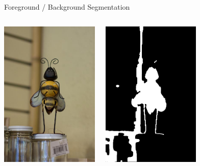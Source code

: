 \documentclass[mathserif]{beamer}
\begin{document}
\begin{frame}{Foreground / Background Segmentation}
\vspace{0.5em}
\begin{columns}[c]
\centering
\includegraphics[width=1.85in]{figures/bee.jpg}

\centering
\includegraphics[width=1.85in]{figures/bee_fbp1.png}
\end{columns}
\end{frame}
\end{document}
